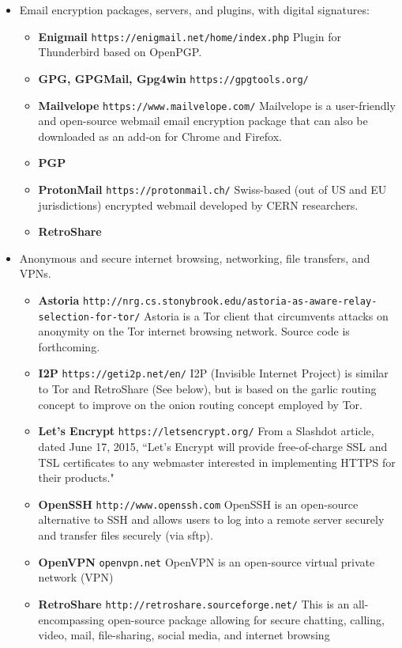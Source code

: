 \begin{itemize}
\begin{itemize}
		\end{itemize}
		\item Email encryption packages, servers, and plugins, with digital signatures:
		\begin{itemize}
			\item {\bf Enigmail} {\tt https://enigmail.net/home/index.php} Plugin for Thunderbird based on OpenPGP.
			\item {\bf GPG, GPGMail, Gpg4win} {\tt https://gpgtools.org/}
			\item {\bf Mailvelope} {\tt https://www.mailvelope.com/} Mailvelope is a user-friendly and open-source webmail email encryption package that can also be downloaded as an add-on for Chrome and Firefox.
			\item {\bf PGP}
			\item {\bf ProtonMail} {\tt https://protonmail.ch/} Swiss-based (out of US and EU jurisdictions) encrypted webmail developed by CERN researchers.
			\item {\bf RetroShare}
		\end{itemize}
		\item Anonymous and secure internet browsing, networking, file transfers, and VPNs.
		\begin{itemize}
			\item {\bf Astoria} {\tt http://nrg.cs.stonybrook.edu/astoria-as-aware-relay-selection-for-tor/} Astoria is a Tor client that circumvents attacks on anonymity on the Tor internet browsing network. Source code is forthcoming.
			\item {\bf I2P} {\tt https://geti2p.net/en/} I2P (Invisible Internet Project) is similar to Tor and RetroShare (See below), but is based on the garlic routing concept to improve on the onion routing concept employed by Tor.
			\item {\bf Let's Encrypt} {\tt https://letsencrypt.org/} From a Slashdot article, dated June 17, 2015, ``Let's Encrypt will provide free-of-charge SSL and TSL certificates to any webmaster interested in implementing HTTPS for their products."
			\item {\bf OpenSSH} {\tt http://www.openssh.com} OpenSSH is an open-source alternative to SSH and allows users to log into a remote server securely and transfer files securely (via sftp).
			\item {\bf OpenVPN} {\tt openvpn.net} OpenVPN is an open-source virtual private network (VPN)
			\item {\bf RetroShare} {\tt http://retroshare.sourceforge.net/} This is an all-encompassing open-source package allowing for secure chatting, calling, video, mail, file-sharing, social media, and internet browsing

\end{itemize}
\end{itemize}
